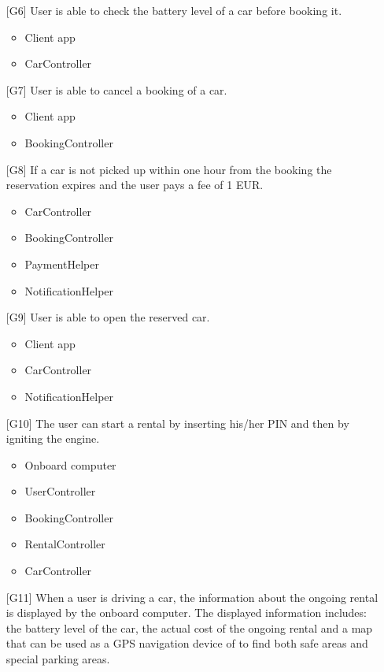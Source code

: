 \begin{itemize}
	\item[{[G6]}] User is able to check the battery level of a car before booking it.
		\begin{itemize}
			\item Client app
			\item CarController
		\end{itemize}
	\item[{[G7]}] User is able to cancel a booking of a car.
		\begin{itemize}
			\item Client app
			\item BookingController
		\end{itemize}
	\item[{[G8]}] If a car is not picked up within one hour from the booking the reservation expires and the user pays a fee of 1 EUR.
		\begin{itemize}
			\item CarController
			\item BookingController
			\item PaymentHelper
			\item NotificationHelper
		\end{itemize}
	\item[{[G9]}] User is able to open the reserved car.
		\begin{itemize}
			\item Client app
			\item CarController
			\item NotificationHelper
		\end{itemize}
	\item[{[G10]}] The user can start a rental by inserting his/her PIN and then by igniting the engine.
		\begin{itemize}
			\item Onboard computer
			\item UserController
			\item BookingController
			\item RentalController
			\item CarController
		\end{itemize}
	\item[{[G11]}] When a user is driving a car, the information about the ongoing rental is displayed by the onboard computer. The displayed information includes: the battery level of the car, the actual cost of the ongoing rental and a map that can be used as a GPS navigation device of to find both safe areas and special parking areas.

\end{itemize}
